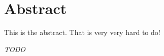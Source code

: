 
\chapter*{Abstract} %
\label{cha:abstract}

This is the abstract. That is very very hard to do!

\emph{TODO}

